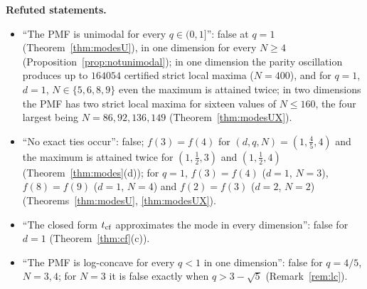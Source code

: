 \documentclass[11pt,a4paper]{article}
\theoremstyle{definition}
\theoremstyle{remark}
\begin{document}
\textbf{Refuted statements.}
\begin{itemize}
\item ``The PMF is unimodal for every $q\in(0,1]$'': false at $q=1$ (Theorem~\ref{thm:modesU}), in one dimension for every $N\ge4$ (Proposition~\ref{prop:notunimodal}); in one dimension the parity oscillation produces up to $164054$ certified strict local maxima ($N=400$), and for $q=1$, $d=1$, $N\in\{5,6,8,9\}$ even the maximum is attained twice; in two dimensions the PMF has two strict local maxima for sixteen values of $N\le160$, the four largest being $N=86,92,136,149$ (Theorem~\ref{thm:modesUX}).
\item ``No exact ties occur'': false; $f(3)=f(4)$ for $(d,q,N)=(1,\frac45,4)$ and the maximum is attained twice for $(1,\frac12,3)$ and $(1,\frac12,4)$ (Theorem~\ref{thm:modes}(d)); for $q=1$, $f(3)=f(4)$ ($d=1$, $N=3$), $f(8)=f(9)$ ($d=1$, $N=4$) and $f(2)=f(3)$ ($d=2$, $N=2$) (Theorems~\ref{thm:modesU}, \ref{thm:modesUX}).
\item ``The closed form $t_{\rm cf}$ approximates the mode in every dimension'': false for $d=1$ (Theorem~\ref{thm:cf}(c)).
\item ``The PMF is log-concave for every $q<1$ in one dimension'': false for $q=4/5$, $N=3,4$; for $N=3$ it is false exactly when $q>3-\sqrt5$ (Remark~\ref{rem:lc}).
\end{itemize}
\end{document}
